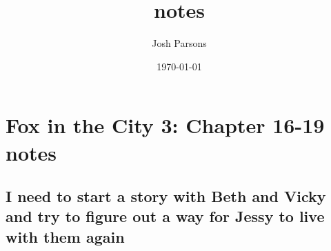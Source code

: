 \documentclass[11pt]{article}
\author{Josh Parsons}
\date{\today}
\title{notes}
\begin{document}
\maketitle
\tableofcontents

\section{Fox in the City 3: Chapter 16-19 notes}
\label{sec-1}

\subsection{I need to start a story with Beth and Vicky and try to figure out a way for Jessy to live with them again}
\label{sec-1-1}
\end{document}
